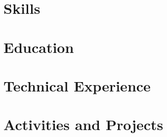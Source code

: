 \documentclass[letter,10pt]{article}
\begin{document}


\section{Skills}


\section{Education}


\section{Technical Experience}



\section{Activities and Projects}

\end{document}
